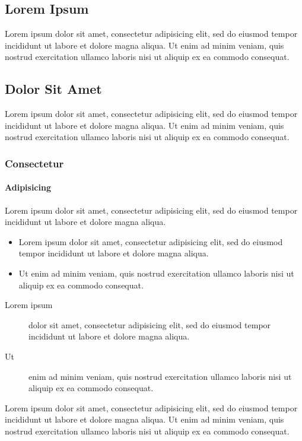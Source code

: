 \documentclass[a5paper]{jsbook}
\begin{document}
\begin{multipagebox}
\section{Lorem Ipsum}
Lorem ipsum dolor sit amet, consectetur adipisicing elit, sed do
eiusmod tempor incididunt ut labore et dolore magna aliqua. Ut enim ad
minim veniam, quis nostrud exercitation ullamco laboris nisi ut
aliquip ex ea commodo consequat.

\renewcommand{\mpboxbgcolor}{gray30}%
\begin{multipagebox}
\subsection{Dolor Sit Amet}
Lorem ipsum dolor sit amet, consectetur adipisicing elit, sed do
eiusmod tempor incididunt ut labore et dolore magna aliqua. Ut enim ad
minim veniam, quis nostrud exercitation ullamco laboris nisi ut
aliquip ex ea commodo consequat. 

\renewcommand{\mpboxbgcolor}{gray10}%
\begin{multipagebox}
\subsubsection{Consectetur}
\paragraph{Adipisicing}
Lorem ipsum dolor sit amet, consectetur adipisicing elit, sed do
eiusmod tempor incididunt ut labore et dolore magna aliqua.
\end{multipagebox}
\end{multipagebox}

\begin{itemize}
\item Lorem ipsum dolor sit amet, consectetur adipisicing elit, sed do
  eiusmod tempor incididunt ut labore et dolore magna aliqua.
\item Ut enim ad minim veniam, quis nostrud exercitation ullamco
  laboris nisi ut aliquip ex ea commodo consequat.
\end{itemize}

\begin{description}
\item [Lorem ipsum] dolor sit amet, consectetur adipisicing elit, sed do
  eiusmod tempor incididunt ut labore et dolore magna aliqua.
\item [Ut] enim ad minim veniam, quis nostrud exercitation ullamco
  laboris nisi ut aliquip ex ea commodo consequat.
\end{description}

Lorem ipsum dolor sit amet, consectetur adipisicing elit, sed do
eiusmod tempor incididunt ut labore et dolore magna aliqua. Ut enim ad
minim veniam, quis nostrud exercitation ullamco laboris nisi ut
aliquip ex ea commodo consequat.
\end{multipagebox}
\end{document}
